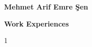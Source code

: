 \documentclass{article}
\begin{document}
\raggedright


\begin{center}
  \huge{\textbf{Mehmet Arif Emre Şen}}
\end{center}        
\begin{multicols}{2} 
  
  
  
  
  \colbreak
  
\end{multicols}

\pagebreak

\begin{center}
  \huge{\textbf{Work Experiences}}
\end{center}      1

  
\pagebreak



\end{document}
